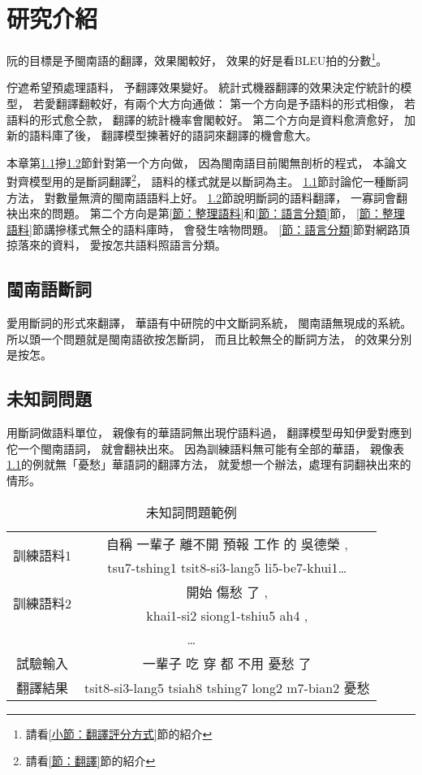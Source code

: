 \chapter{研究介紹}
\label{章：研究介紹}

阮的目標是予閩南語的翻譯，效果閣較好，
效果的好是看BLEU拍的分數\footnote{請看\ref{小節：翻譯評分方式}節的紹介}。

佇遮希望預處理語料，
予翻譯效果變好。
統計式機器翻譯的效果決定佇統計的模型，
若愛翻譯翻較好，有兩个大方向通做：
第一个方向是予語料的形式相像，
若語料的形式愈仝款，
翻譯的統計機率會閣較好。
第二个方向是資料愈濟愈好，
加新的語料庫了後，
翻譯模型揀著好的語詞來翻譯的機會愈大。

本章第\ref{節：閩南語斷詞}摻\ref{節：未知詞問題}節針對第一个方向做，
因為閩南語目前閣無剖析的程式，
本論文對齊模型用的是斷詞翻譯\footnote{請看\ref{節：翻譯}節的紹介}，
語料的樣式就是以斷詞為主。
\ref{節：閩南語斷詞}節討論佗一種斷詞方法，
對數量無濟的閩南語語料上好。
\ref{節：未知詞問題}節說明斷詞的語料翻譯，
一寡詞會翻袂出來的問題。
第二个方向是第\ref{節：整理語料}和\ref{節：語言分類}節，
\ref{節：整理語料}節講摻樣式無仝的語料庫時，
會發生啥物問題。
\ref{節：語言分類}節對網路頂掠落來的資料，
愛按怎共語料照語言分類。

\section{閩南語斷詞}
\label{節：閩南語斷詞}
愛用斷詞的形式來翻譯，
華語有中研院的中文斷詞系統，
閩南語無現成的系統。
所以頭一个問題就是閩南語欲按怎斷詞，
而且比較無仝的斷詞方法，
的效果分別是按怎。

\section{未知詞問題}
\label{節：未知詞問題}
用斷詞做語料單位，
親像有的華語詞無出現佇語料過，
翻譯模型毋知伊愛對應到佗一个閩南語詞，
就會翻袂出來。
因為訓練語料無可能有全部的華語，
親像表\ref{表：未知詞問題範例}的例就無「憂愁」華語詞的翻譯方法，
就愛想一个辦法，處理有詞翻袂出來的情形。


\begin{table}
\caption{未知詞問題範例}
\label{表：未知詞問題範例}
\centering
\begin{tabular}{c|c}
\hline
\multirow{2}{*}{訓練語料1} & 自稱 一輩子 離不開 預報 工作 的 吳德榮 , \\
 & tsu7-tshing1 tsit8-si3-lang5 li5-be7-khui1… \\
\hline
\multirow{2}{*}{訓練語料2} & 開始 傷愁 了 , \\
 & khai1-si2 siong1-tshiu5 ah4 , \\
\hline
\multicolumn{2}{c}{…} \\
\hline
\hline
試驗輸入 & 一輩子 吃 穿 都 不用 憂愁 了 \\
\hline
翻譯結果 & tsit8-si3-lang5 tsiah8 tshing7 long2 m7-bian2 憂愁 \\
\hline
\end{tabular}
\end{table}

